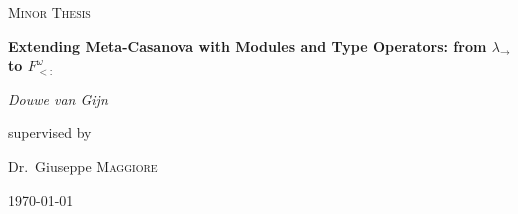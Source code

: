 \documentclass[12pt,a4paper]{report}
\begin{document}
\begin{titlepage}
	\centering
	\vspace{1cm}
	{\scshape\Large Minor Thesis\par}
	\vspace{1.5cm}
	       {\huge\bfseries Extending Meta-Casanova with Modules and Type Operators: from $\lambda_→$ to $F^\omega_{<:}$\par}
	\vspace{2cm}
	{\Large\itshape Douwe van Gijn\par}
	\vfill
	supervised by\par
	Dr.~Giuseppe \textsc{Maggiore}
	\vfill
	{\large \today\par}
\end{titlepage}
\end{document}
